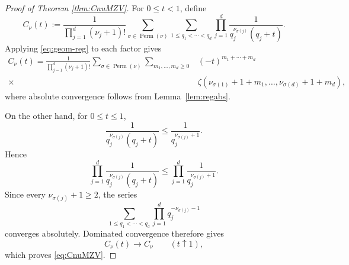 \documentclass[10pt,a4paper]{amsart}
\begin{document}
\begin{proof}[Proof of Theorem \ref{thm:CnuMZV}]
For $0\leq t<1$, define
\[
 C_\nu(t)
 :=
 \frac{1}
 {\prod_{j=1}^d(\nu_j+1)!}
 \sum_{\sigma\in\operatorname{Perm}(\nu)}
 \sum_{1\leq q_1<\cdots<q_d}
 \prod_{j=1}^d
 \frac{1}
 {q_j^{\nu_{\sigma(j)}}(q_j+t)}.
\]
Applying \eqref{eq:geom-reg} to each factor gives
\begin{align*}
 C_\nu(t)
 =
 \frac{1}
 {\prod_{j=1}^d(\nu_j+1)!}
 \sum_{\sigma\in\operatorname{Perm}(\nu)}
 \sum_{m_1,\ldots,m_d\geq0}
 &
 (-t)^{m_1+\cdots+m_d}\\
 {}\times&
 \zeta\!\left(
 \nu_{\sigma(1)}+1+m_1,\ldots,
 \nu_{\sigma(d)}+1+m_d
 \right),
\end{align*}
where absolute convergence follows from
Lemma~\ref{lem:regabs}.

On the other hand, for $0\leq t\leq1$,
\[
 \frac{1}
 {q_j^{\nu_{\sigma(j)}}(q_j+t)}
 \leq
 \frac{1}
 {q_j^{\nu_{\sigma(j)}+1}}.
\]
Hence
\[
 \prod_{j=1}^d
 \frac{1}
 {q_j^{\nu_{\sigma(j)}}(q_j+t)}
 \leq
 \prod_{j=1}^d
 \frac{1}
 {q_j^{\nu_{\sigma(j)}+1}}.
\]
Since every $\nu_{\sigma(j)}+1\geq2$, the series
\[
 \sum_{1\leq q_1<\cdots<q_d}
 \prod_{j=1}^d
 q_j^{-\nu_{\sigma(j)}-1}
\]
converges absolutely.  Dominated convergence therefore gives
\[
        C_\nu(t)\longrightarrow C_\nu
        \qquad (t\uparrow1),
\]
which proves \eqref{eq:CnuMZV}.
\end{proof}
\end{document}
